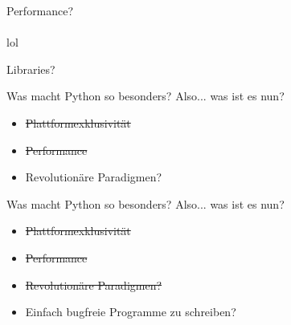 \documentclass{beamer}
\begin{document}
{
  \begin{frame}[plain]
  \end{frame}
}

\begin{frame}
\begin{center}
{ \Huge Performance?}\\~\\
lol
\end{center}
\end{frame}

\begin{frame}
\begin{center}
{ \Huge Libraries?}
\end{center}
\end{frame}

\begin{frame}[t]{Was macht Python so besonders?}
Also... was ist es nun?
\pause
\begin{itemize}
\item \sout{Plattformexklusivität}
\pause
\item \sout{Performance}
\pause
\item Revolutionäre Paradigmen?
\end{itemize}
\end{frame}

\begin{frame}[t]{Was macht Python so besonders?}
Also... was ist es nun?
\begin{itemize}
\item \sout{Plattformexklusivität}
\item \sout{Performance}
\item \sout{Revolutionäre Paradigmen?}
\item Einfach bugfreie Programme zu schreiben? %
\end{itemize}
\end{frame}
\end{document}
